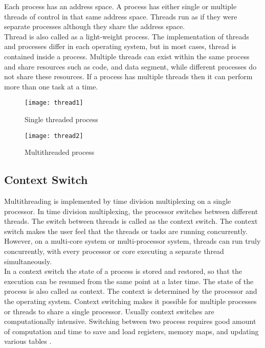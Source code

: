 Each process has an address space. A process has either single or multiple threads of control in that same address space. Threads run as if they were separate processes although they share the address space. \cite{Galvin}
\\
Thread is also called as a light-weight process. The implementation of threads and processes differ in each operating system, but in most cases, thread is contained inside a process. Multiple threads can exist within the same process and share resources such as code, and data segment, while different processes do not share these resources. If a process has multiple threads then it can perform more than one task at a time. 

\begin{figure}[!ht]
\centering
\texttt{[image: thread1]}
\caption{Single threaded process}
\label{fig:thread1}
\end{figure}

\begin{figure}[!ht]
\centering
\texttt{[image: thread2]}
\caption{Multithreaded process}
\label{fig:thread2}
\end{figure}

\subsection{Context Switch}

Multithreading is implemented by time division multiplexing on a single processor. In time division multiplexing, the processor switches between different threads. The switch between threads is called as the context switch. The context switch makes the user feel that the threads or tasks are running concurrently. However, on a multi-core system or multi-processor system, threads can run truly concurrently, with every processor or core executing a separate thread simultaneously. 
\\
In a context switch the state of a process is stored and restored, so that the execution can be resumed from the same point at a later time. The state of the process is also called as context. The context is determined by the processor and the operating system. Context switching makes it possible for multiple processes or threads to share a single processor. Usually context switches are computationally intensive. Switching between two process requires good amount of computation and time to save and load registers, memory maps, and updating various tables\cite{Galvin} .

